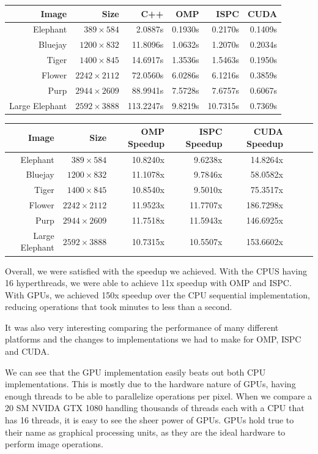 \documentclass[12pt]{article}
\begin{document}
\begin{tabular}{r|r|r|r|r|r}
    Image & Size & C++ & OMP  & ISPC & CUDA
\\  \hline
    Elephant & $389 \times 584$ & 2.0887s & 0.1930s  & 0.2170s & 0.1409s
\\  Bluejay & $1200 \times 832$ & 11.8096s & 1.0632s  & 1.2070s  & 0.2034s
\\  Tiger & $1400 \times 845$ & 14.6917s & 1.3536s  & 1.5463s  & 0.1950s
\\  Flower & $2242 \times 2112$ & 72.0560s & 6.0286s  & 6.1216s  & 0.3859s
\\  Purp & $2944 \times 2609$ & 88.9941s & 7.5728s  & 7.6757s  & 0.6067s
\\  Large Elephant & $2592 \times 3888$ & 113.2247s  & 9.8219s  & 10.7315s & 0.7369s
\end{tabular}

\begin{tabular}{r|r|r|r|r|r|r|r}
    Image & Size & OMP Speedup & ISPC Speedup & CUDA Speedup
\\  \hline
    Elephant & $389 \times 584$ & 10.8240x & 9.6238x & 14.8264x
\\  Bluejay & $1200 \times 832$ & 11.1078x & 9.7846x & 58.0582x
\\  Tiger & $1400 \times 845$ & 10.8540x & 9.5010x & 75.3517x
\\  Flower & $2242 \times 2112$ & 11.9523x & 11.7707x & 186.7298x
\\  Purp & $2944 \times 2609$ & 11.7518x & 11.5943x & 146.6925x
\\  Large Elephant & $2592 \times 3888$ & 10.7315x & 10.5507x & 153.6602x
\end{tabular}

Overall, we were satisfied with the speedup we achieved. With the CPUS having
16 hyperthreads, we were able to achieve 11x speedup with OMP and ISPC. With
GPUs, we achieved 150x speedup over the CPU sequential implementation, reducing
operations that took minutes to less than a second.

It was also very interesting comparing the performance of many different
platforms and the changes to implementations we had to make for OMP, ISPC and
CUDA.

We can see that the GPU implementation easily beats out both CPU
implementations. This is mostly due to the hardware nature of GPUs, having
enough threads to be able to parallelize operations per pixel. When we compare
a 20 SM NVIDA GTX 1080 handling thousands of threads each with a CPU that has
16 threads, it is easy to see the sheer power of GPUs. GPUs hold true to their
name as graphical processing units, as they are the ideal hardware to perform
image operations.
\end{document}
